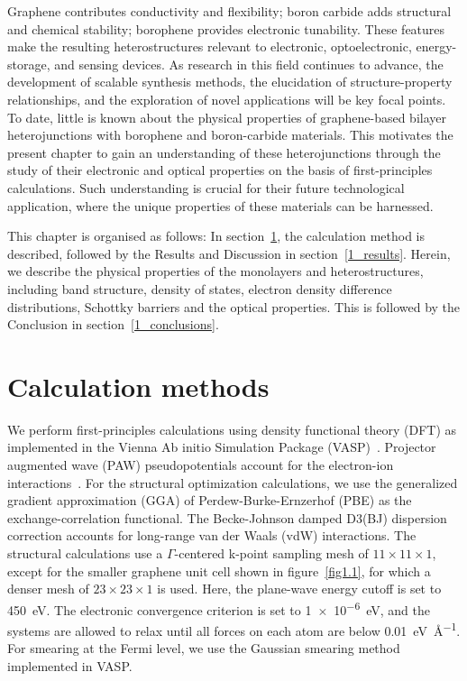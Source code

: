 Graphene contributes conductivity and flexibility; boron carbide adds structural and chemical stability; borophene provides electronic tunability.
These features make the resulting heterostructures relevant to electronic, optoelectronic, energy-storage, and sensing devices.
As research in this field continues to advance,
the development of scalable synthesis methods, the elucidation of structure-property relationships,
and the exploration of novel applications will be key focal points.
To date, little is known about the physical properties of graphene-based bilayer heterojunctions with borophene and boron-carbide materials.
This motivates the present chapter to gain an understanding of these heterojunctions
through the study of their electronic and optical properties on the basis of first-principles calculations.
Such understanding is crucial for their future technological application,
where the unique properties of these materials can be harnessed.

This chapter is organised as follows:
In section~\ref{1_calculation_methods}, the calculation method is described,
followed by the Results and Discussion in section~\ref{1_results}.
Herein, we describe the physical properties of the monolayers and heterostructures, including band structure, density of states, electron density difference distributions,
Schottky barriers and the optical properties.
This is followed by the Conclusion in section~\ref{1_conclusions}.

\section{Calculation methods}
\label{1_calculation_methods}

We perform first-principles calculations using density functional theory (DFT) as implemented in the Vienna Ab initio Simulation Package (VASP)~\cite{kresse1993ab, kresse1996efficiency, kresse1996efficient}.
Projector augmented wave (PAW) pseudopotentials account for the electron-ion interactions~\cite{kresse1999ultrasoft}.
For the structural optimization calculations, we use the generalized gradient approximation (GGA) of Perdew-Burke-Ernzerhof (PBE) as the exchange-correlation functional.
The Becke-Johnson damped D3(BJ) dispersion correction accounts for long-range van der Waals (vdW) interactions.
The structural calculations use a $\Gamma$-centered k-point sampling mesh of $11 \times 11 \times 1$, except for the smaller graphene unit cell shown in figure~\ref{fig1.1}, for which a denser mesh of $23 \times 23 \times 1$ is used.
Here, the plane-wave energy cutoff is set to \qty{450}{\electronvolt}.
The electronic convergence criterion is set to \qty{1e-6}{\electronvolt}, and the systems are allowed to relax until all forces on each atom are below \qty{0.01}{\electronvolt\per\angstrom}.
For smearing at the Fermi level,
we use the Gaussian smearing method implemented in VASP.

